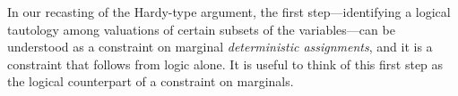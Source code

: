 {%

In our recasting of the Hardy-type argument, the first step---identifying a logical tautology among valuations of certain subsets of the variables---can be understood as a constraint on marginal {\em deterministic assignments}, and it is a constraint that follows from logic alone.  
It is useful to think of this first step as the logical counterpart of a constraint on marginals. 





}
